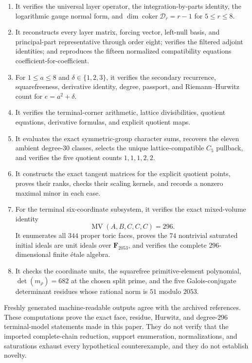 \documentclass[11pt,reqno]{amsart}
\begin{document}
\begin{enumerate}[label=(\arabic*)]
\item It verifies the universal layer operator, the integration-by-parts
identity, the logarithmic gauge normal form, and
\(\dim\operatorname{coker}\mathscr D_r=r-1\) for \(5\le r\le8\).
\item It reconstructs every layer matrix, forcing vector, left-null basis,
and principal-part representative through order eight; verifies the
filtered adjoint identities; and reproduces the fifteen normalized
compatibility equations coefficient-for-coefficient.
\item For \(1\le a\le8\) and \(\delta\in\{1,2,3\}\), it verifies the
secondary recurrence, squarefreeness, derivative identity, degree,
passport, and Riemann--Hurwitz count for \(e=a^2+\delta\).
\item It verifies the terminal-corner arithmetic, lattice divisibilities,
quotient equations, derivative formulas, and explicit quotient maps.
\item It evaluates the exact symmetric-group character sums, recovers the
eleven ambient degree-\(30\) classes, selects the unique lattice-compatible
\(C_5\) pullback, and verifies the five quotient counts \(1,1,1,2,2\).
\item It constructs the exact tangent matrices for the explicit quotient
points, proves their ranks, checks their scaling kernels, and records a
nonzero maximal minor in each case.
\item For the terminal six-coordinate subsystem, it verifies the exact
mixed-volume identity
\[
 \operatorname{MV}(A,B,C,C,C)=296.
\]
It enumerates all \(344\) proper toric faces, proves the \(74\) nontrivial
saturated initial ideals are unit ideals over \(\mathbf F_{2053}\), and
verifies the complete \(296\)-dimensional finite \'{e}tale algebra.
\item It checks the coordinate units, the squarefree primitive-element
polynomial, \(\det(m_\rho)=682\) at the chosen split prime, and the five
Galois-conjugate determinant residues whose rational norm is \(51\) modulo
\(2053\).
\end{enumerate}

Freshly generated machine-readable outputs agree with the archived
references.  These computations prove the exact face, residue, Hurwitz, and
degree-\(296\) terminal-model statements made in this paper.  They do not
verify that the imported complete-chain reduction, support enumeration,
normalizations, and saturations exhaust every hypothetical counterexample,
and they do not establish novelty.
\end{document}
